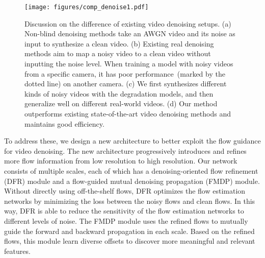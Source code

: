 \documentclass[10pt,twocolumn,letterpaper]{article}
\newlength \g
\begin{document}
\begin{figure*}[t]
    \begin{center}
\vspace{-4mm}
    \texttt{[image: figures/comp\_denoise1.pdf]}
    \end{center}
    \vspace{-4mm}
    \caption{Discussion on the difference of existing video denoising setups. (a) Non-blind denoising methods take an AWGN video and its noise as input to synthesize a clean video. (b) Existing real denoising methods aim to map a noisy video to a clean video without inputting the noise level. When training a model with noisy videos from a specific camera, it has poor performance~(marked by the dotted line) on another camera. (c) 
We first synthesizes different kinds of noisy videos with the degradation models, and then generalize well on different real-world videos. 
    (d) Our method outperforms existing state-of-the-art video denoising methods and maintains good efficiency.
    }
    \label{fig:diff}
    \vspace{-0.5cm}
\end{figure*}




To address these, we design a new architecture to better exploit the flow guidance for video denoising.
The new architecture progressively introduces and refines more flow information from low resolution to high resolution. Our network consists of multiple scales, each of which has a denoising-oriented flow refinement (DFR) module and a flow-guided mutual denoising propagation (FMDP) module. 
Without directly using off-the-shelf flows, DFR optimizes the flow estimation networks by minimizing the loss between the noisy flows and clean flows.
In this way, DFR is able to reduce the sensitivity of the flow estimation networks to different levels of noise.
The FMDP module uses the refined flows to mutually guide the forward and backward propagation in each scale. Based on the refined flows, this module learn diverse offsets to discover more meaningful and relevant features.
\end{document}
